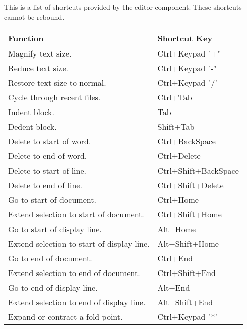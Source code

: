 This is a list of shortcuts provided by the \codeblocks editor component. These shortcuts cannot be rebound.

{\small
\begin{longtable}{|l|l|}\hline
\textbf{Function}		                    &   \textbf{Shortcut Key}   \\ \hline
\endhead   %
Magnify text size. 	                        &   Ctrl+Keypad "+"         \\ \hline
Reduce text size. 	                        &   Ctrl+Keypad "-"         \\ \hline
Restore text size to normal. 	            &   Ctrl+Keypad "/"         \\ \hline
Cycle through recent files. 	            &   Ctrl+Tab                \\ \hline
Indent block. 	                            &   Tab                     \\ \hline
Dedent block. 	                            &   Shift+Tab               \\ \hline
Delete to start of word. 	                &   Ctrl+BackSpace          \\ \hline
Delete to end of word. 	                    &   Ctrl+Delete             \\ \hline
Delete to start of line. 	                &   Ctrl+Shift+BackSpace    \\ \hline
Delete to end of line. 	                    &   Ctrl+Shift+Delete       \\ \hline
Go to start of document. 	                &   Ctrl+Home               \\ \hline
Extend selection to start of document. 	    &   Ctrl+Shift+Home         \\ \hline
Go to start of display line. 	            &   Alt+Home                \\ \hline
Extend selection to start of display line. 	&   Alt+Shift+Home          \\ \hline
Go to end of document. 	                    &   Ctrl+End                \\ \hline
Extend selection to end of document. 	    &   Ctrl+Shift+End          \\ \hline
Go to end of display line. 	                &   Alt+End                 \\ \hline
Extend selection to end of display line. 	&   Alt+Shift+End           \\ \hline
Expand or contract a fold point. 	        &   Ctrl+Keypad "*"         \\ \hline

\end{longtable}}
